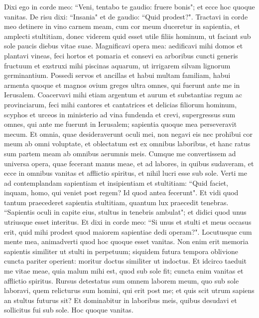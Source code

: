 \begin{biblechapter}  
\verse Dixi ego in corde meo: “Veni, tentabo te gaudio: fruere bonis"; et ecce hoc quoque vanitas. 
\verse De risu dixi: “Insania" et de gaudio: “Quid prodest?". 
\verse Tractavi in corde meo detinere in vino carnem meam, cum cor meum duceretur in sapientia, et amplecti stultitiam, donec viderem quid esset utile filiis hominum, ut faciant sub sole paucis diebus vitae suae. 
\verse Magnificavi opera mea: aedificavi mihi domos et plantavi vineas, 
\verse feci hortos et pomaria et consevi ea arboribus cuncti generis fructuum 
\verse et exstruxi mihi piscinas aquarum, ut irrigarem silvam lignorum germinantium. 
\verse Possedi servos et ancillas et habui multam familiam, habui armenta quoque et magnos ovium greges ultra omnes, qui fuerunt ante me in Ierusalem. 
\verse Coacervavi mihi etiam argentum et aurum et substantias regum ac provinciarum, feci mihi cantores et cantatrices et delicias filiorum hominum, scyphos et urceos in ministerio ad vina fundenda 
\verse et crevi, supergressus sum omnes, qui ante me fuerunt in Ierusalem; sapientia quoque mea perseveravit mecum. 
\verse Et omnia, quae desideraverunt oculi mei, non negavi eis nec prohibui cor meum ab omni voluptate, et oblectatum est ex omnibus laboribus, et hanc ratus sum partem meam ab omnibus aerumnis meis. 
\verse Cumque me convertissem ad universa opera, quae fecerant manus meae, et ad labores, in quibus sudaveram, et ecce in omnibus vanitas et afflictio spiritus, et nihil lucri esse sub sole. 
\verse Verti me ad contemplandam sapientiam et insipientiam et stultitiam: “Quid faciet, inquam, homo, qui veniet post regem? Id quod antea fecerunt". 
\verse Et vidi quod tantum praecederet sapientia stultitiam, quantum lux praecedit tenebras. 
\verse “Sapientis oculi in capite eius, stultus in tenebris ambulat"; et didici quod unus utriusque esset interitus. 
\verse Et dixi in corde meo: “Si unus et stulti et meus occasus erit, quid mihi prodest quod maiorem sapientiae dedi operam?". Locutusque cum mente mea, animadverti quod hoc quoque esset vanitas. 
\verse Non enim erit memoria sapientis similiter ut stulti in perpetuum; siquidem futura tempora oblivione cuncta pariter operient: moritur doctus similiter ut indoctus. 
\verse Et idcirco taeduit me vitae meae, quia malum mihi est, quod sub sole fit; cuncta enim vanitas et afflictio spiritus. 
\verse Rursus detestatus sum omnem laborem meum, quo sub sole laboravi, quem relicturus sum homini, qui erit post me; 
\verse et quis scit utrum sapiens an stultus futurus sit? Et dominabitur in laboribus meis, quibus desudavi et sollicitus fui sub sole. Hoc quoque vanitas. 

\end{biblechapter}
